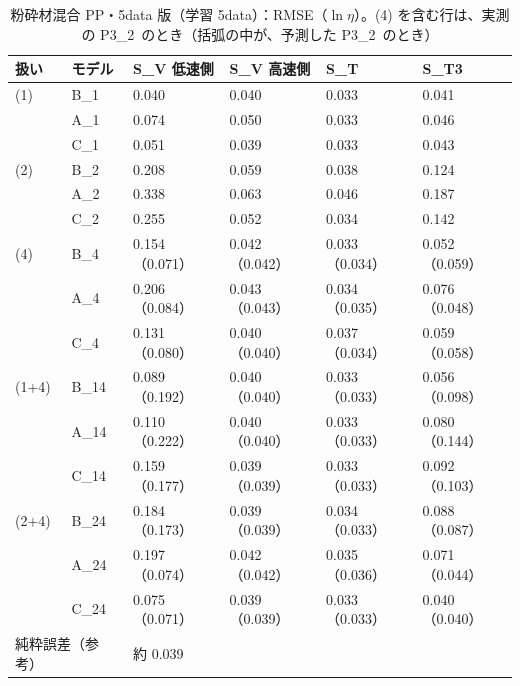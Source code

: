 \documentclass[paper=a4paper,fontsize=10.5pt,line_length=44zw,number_of_lines=38]{jlreq}
\newcommand{\PII}{P3\_2}
\begin{document}
\begin{table}[H]
\caption{粉砕材混合 PP・5data 版（学習 5data）：RMSE（$\ln\eta$）。(4) を含む行は、実測の \PII\ のとき（括弧の中が、予測した \PII\ のとき）}\label{tab:met_5data_MIX}
\footnotesize
\begin{tabularx}{\linewidth}{@{}llXXXX@{}}
\toprule
扱い & モデル & S\_V 低速側 & S\_V 高速側 & S\_T & S\_T3 \\
\midrule
(1) & B\_1 & 0.040 & 0.040 & 0.033 & 0.041 \\
 & A\_1 & 0.074 & 0.050 & 0.033 & 0.046 \\
 & C\_1 & 0.051 & 0.039 & 0.033 & 0.043 \\
\midrule
(2) & B\_2 & 0.208 & 0.059 & 0.038 & 0.124 \\
 & A\_2 & 0.338 & 0.063 & 0.046 & 0.187 \\
 & C\_2 & 0.255 & 0.052 & 0.034 & 0.142 \\
\midrule
(4) & B\_4 & 0.154（0.071） & 0.042（0.042） & 0.033（0.034） & 0.052（0.059） \\
 & A\_4 & 0.206（0.084） & 0.043（0.043） & 0.034（0.035） & 0.076（0.048） \\
 & C\_4 & 0.131（0.080） & 0.040（0.040） & 0.037（0.034） & 0.059（0.058） \\
\midrule
(1+4) & B\_14 & 0.089（0.192） & 0.040（0.040） & 0.033（0.033） & 0.056（0.098） \\
 & A\_14 & 0.110（0.222） & 0.040（0.040） & 0.033（0.033） & 0.080（0.144） \\
 & C\_14 & 0.159（0.177） & 0.039（0.039） & 0.033（0.033） & 0.092（0.103） \\
\midrule
(2+4) & B\_24 & 0.184（0.173） & 0.039（0.039） & 0.034（0.033） & 0.088（0.087） \\
 & A\_24 & 0.197（0.074） & 0.042（0.042） & 0.035（0.036） & 0.071（0.044） \\
 & C\_24 & 0.075（0.071） & 0.039（0.039） & 0.033（0.033） & 0.040（0.040） \\
\multicolumn{2}{l}{純粋誤差（参考）} & \multicolumn{4}{l}{約 0.039} \\
\bottomrule
\end{tabularx}
\end{table}
\end{document}
